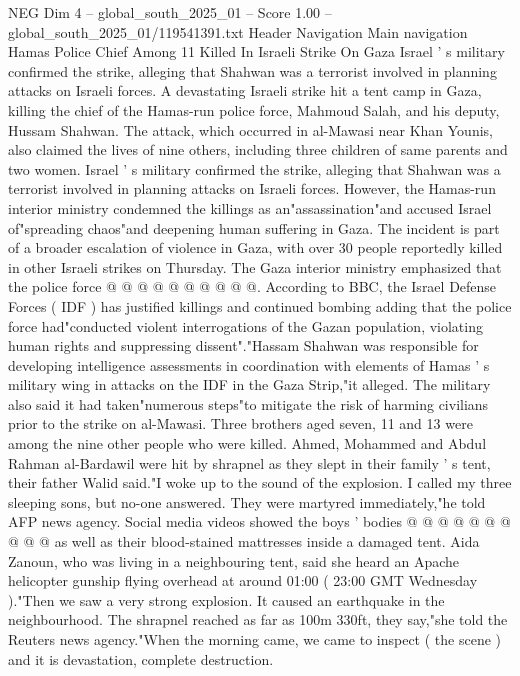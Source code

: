 \begin{textsample}{NEG Dim 4 – global\_south\_2025\_01 – Score 1.00 – global\_south\_2025\_01/119541391.txt}  \label{ex:f4_neg_448}
Header Navigation Main navigation Hamas Police Chief Among 11 Killed In Israeli Strike On Gaza Israel ' s military confirmed the strike, alleging that Shahwan was a terrorist involved in planning attacks on Israeli forces.
A devastating Israeli strike hit a tent camp in Gaza, killing the chief of the Hamas-run police force, Mahmoud Salah, and his deputy, Hussam Shahwan.
The attack, which occurred in al-Mawasi near Khan Younis, also claimed the lives of nine others, including three children of same parents and two women.
Israel ' s military confirmed the strike, alleging that Shahwan was a terrorist involved in planning attacks on Israeli forces.
However, the Hamas-run interior ministry condemned the killings as an"assassination"and accused Israel of"spreading chaos"and deepening human suffering in Gaza.
The incident is part of a broader escalation of violence in Gaza, with over 30 people reportedly killed in other Israeli strikes on Thursday.
The Gaza interior ministry emphasized that the police force @ @ @ @ @ @ @ @ @ @.
According to BBC, the Israel Defense Forces ( IDF ) has justified killings and continued bombing adding that the police force had"conducted violent interrogations of the Gazan population, violating human rights and suppressing dissent"."Hassam Shahwan was responsible for developing intelligence assessments in coordination with elements of Hamas ' s military wing in attacks on the IDF in the Gaza Strip,"it alleged.
The military also said it had taken"numerous steps"to mitigate the risk of harming civilians prior to the strike on al-Mawasi.
Three brothers aged seven, 11 and 13 were among the nine other people who were killed.
Ahmed, Mohammed and Abdul Rahman al-Bardawil were hit by shrapnel as they slept in their family ' s tent, their father Walid said."I woke up to the sound of the explosion.
I called my three sleeping sons, but no-one answered.
They were martyred immediately,"he told AFP news agency.
Social media videos showed the boys ' bodies @ @ @ @ @ @ @ @ @ @ as well as their blood-stained mattresses inside a damaged tent.
Aida Zanoun, who was living in a neighbouring tent, said she heard an Apache helicopter gunship flying overhead at around 01:00 ( 23:00 GMT Wednesday )."Then we saw a very strong explosion.
It caused an earthquake in the neighbourhood.
The shrapnel reached as far as 100m 330ft, they say,"she told the Reuters news agency."When the morning came, we came to inspect ( the scene ) and it is devastation, complete destruction.

\end{textsample}
